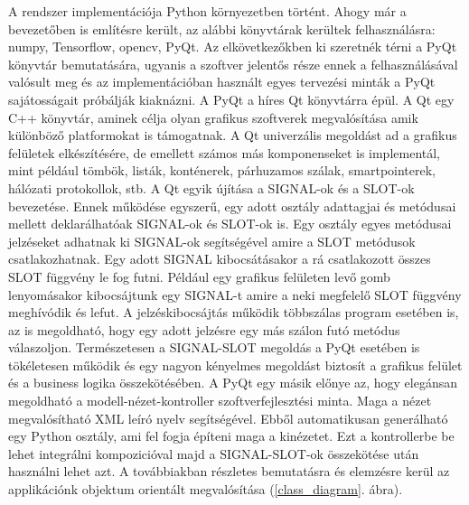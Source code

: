 \documentclass[12pt, a4paper, oneside]{book}
\theoremstyle{tetel}
\begin{document}
A rendszer implementációja Python környezetben történt. Ahogy már a bevezetőben is említésre került, az alábbi könyvtárak kerültek felhasználásra: numpy, Tensorflow, opencv, PyQt. Az elkövetkezőkben ki szeretnék térni a PyQt könyvtár bemutatására, ugyanis a szoftver jelentős része ennek a felhasználásával valósult meg és az implementációban használt egyes tervezési minták a PyQt sajátosságait próbálják kiaknázni.
\newline
\indent
A PyQt a híres Qt könyvtárra épül. A Qt egy C++ könyvtár, aminek célja olyan grafikus szoftverek megvalósítása amik különböző platformokat is támogatnak. A Qt univerzális megoldást ad a grafikus felületek elkészítésére, de emellett számos más komponenseket is implementál, mint például tömbök, listák, konténerek, párhuzamos szálak, smartpointerek, hálózati protokollok, stb. A Qt egyik újítása a SIGNAL-ok és a SLOT-ok bevezetése. Ennek működése egyszerű, egy adott osztály adattagjai és metódusai mellett deklarálhatóak SIGNAL-ok és SLOT-ok is. Egy osztály egyes metódusai jelzéseket adhatnak ki SIGNAL-ok segítségével amire a SLOT metódusok csatlakozhatnak. Egy adott SIGNAL kibocsátásakor a rá csatlakozott összes SLOT függvény le fog futni. Például egy grafikus felületen levő gomb lenyomásakor kibocsájtunk egy SIGNAL-t amire a neki megfelelő SLOT függvény meghívódik és lefut. A jelzéskibocsájtás működik többszálas program esetében is, az is megoldható, hogy egy adott jelzésre egy más szálon futó metódus válaszoljon. Természetesen a SIGNAL-SLOT megoldás a PyQt esetében is tökéletesen működik és egy nagyon kényelmes megoldást biztosít a grafikus felület és a business logika összekötésében.
\newline
\indent
A PyQt egy másik előnye az, hogy elegánsan megoldható a modell-nézet-kontroller szoftverfejlesztési minta. Maga a nézet megvalósítható XML leíró nyelv segítségével. Ebből automatikusan generálható egy Python osztály, ami fel fogja építeni maga a kinézetet. Ezt a kontrollerbe be lehet integrálni kompozicióval majd a SIGNAL-SLOT-ok összekötése után használni lehet azt. 
\newline
\indent
A továbbiakban részletes bemutatásra és elemzésre kerül az applikációnk objektum orientált megvalósítása (\ref{class_diagram}. ábra).
\end{document}
